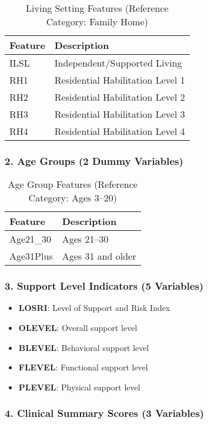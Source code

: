\begin{table}[ht]
\centering
\caption{Living Setting Features (Reference Category: Family Home)}
\begin{tabular}{ll}
\toprule
\textbf{Feature} & \textbf{Description} \\
\midrule
ILSL & Independent/Supported Living \\
RH1 & Residential Habilitation Level 1 \\
RH2 & Residential Habilitation Level 2 \\
RH3 & Residential Habilitation Level 3 \\
RH4 & Residential Habilitation Level 4 \\
\bottomrule
\end{tabular}
\end{table}

\subsubsection{2. Age Groups (2 Dummy Variables)}

\begin{table}[ht]
\centering
\caption{Age Group Features (Reference Category: Ages 3--20)}
\begin{tabular}{ll}
\toprule
\textbf{Feature} & \textbf{Description} \\
\midrule
Age21\_30 & Ages 21--30 \\
Age31Plus & Ages 31 and older \\
\bottomrule
\end{tabular}
\end{table}

\subsubsection{3. Support Level Indicators (5 Variables)}

\begin{itemize}
    \item \textbf{LOSRI}: Level of Support and Risk Index
    \item \textbf{OLEVEL}: Overall support level
    \item \textbf{BLEVEL}: Behavioral support level
    \item \textbf{FLEVEL}: Functional support level
    \item \textbf{PLEVEL}: Physical support level
\end{itemize}

\subsubsection{4. Clinical Summary Scores (3 Variables)}

